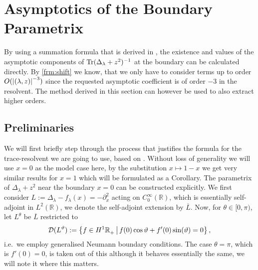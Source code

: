 \section{Asymptotics of the Boundary Parametrix}
By using a summation formula that is derived in \cite[2.2]{LV13}, the existence
and values of the asymptotic components of $\operatorname{Tr}(\Delta_\lambda + z^2)^{-1}$ at
the boundary can be calculated directly. By \cref{frm:shift} we know, that we
only have to consider terms up to order $O(\left|(\lambda,z)\right|^{-3})$ since the
requested asymptotic coefficient is of order $-3$ in the resolvent.  The method
derived in this section can however be used to also extract higher orders.

\subsection{Preliminaries}
We will first briefly step through the process that justifies the formula for
the trace-resolvent we are going to use, based on \cite{LV13}.  Without loss of
generality we will use $x = 0$ as the model case here, by the substitution
$x\mapsto 1-x$ we get very similar results for $x=1$ which will be formulated as
a Corollary. The parametrix of $\Delta_\lambda + z^2$ near the boundary $x=0$
can be constructed explicitly. We first consider $L := \Delta_\lambda -
f_\lambda(x) = -\partial_x^2$ acting on $C_0^\infty(\mathbb{R})$, which is
essentially self-adjoint in $L^2(\mathbb{R})$, we denote the self-adjoint
extension by $\overline L$. Now, for $\theta \in [0,\pi)$, let $L^\theta$ be
  $\overline L$ restricted to
\begin{equation*}
  \mathcal{D}(L^\vartheta) := \left\{ f\in H^1{\mathbb{R}_+^{}}\, \middle|\, f(0)\cos\vartheta +
  f'(0)\sin(\vartheta) = 0\right\},
\end{equation*}
i.e.\ we employ generalised Neumann boundary conditions. The case $\theta =
\pi$, which is $f'(0) = 0$, is taken out of this although it behaves essentially
the same, we will note it where this matters.

